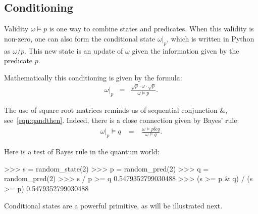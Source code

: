 \documentclass[leqno]{tufte-book} %
\newcommand{\Python}{\textrm{Python}\xspace}
\newcommand{\andthen}{\mathrel{\&}}
\begin{document}
\subsection{Conditioning}\label{subsec:qpred:conditioning}

Validity $\omega\models p$ is one way to combine states and
predicates. When this validity is non-zero, one can also form the
conditional state $\omega|_{p}$,
which is written in \Python as $\omega/p$. This new state is an update
of $\omega$ given the information given by the predicate $p$.

Mathematically this conditioning is given by the formula:
\begin{equation}
\label{eqn:qconditiong}
\begin{array}{rcl}
\omega|_{p}
& = &
\displaystyle\frac{\sqrt{p} \cdot \omega \cdot \sqrt{p}}{\omega\models p}.
\end{array}
\end{equation}

\noindent The use of square root matrices reminds us of sequential
conjunction $\andthen$, see~\eqref{eqn:qandthen}. Indeed, there is a
close connection given by Bayes' rule:
\begin{equation}
\label{eqn:qbayes}
\begin{array}{rcl}
\omega|_{p} \models q
& \;=\; &
\displaystyle\frac{\omega\models p\andthen q}{\omega\models q}.
\end{array}
\end{equation}

\noindent Here is a test of Bayes rule in the quantum world:
\begin{python}
>>> s = random_state(2)
>>> p = random_pred(2)
>>> q = random_pred(2)
>>> s / p >= q
0.5479352799030488
>>> (s >= p & q) / (s >= p)
0.5479352799030488
\end{python}

\noindent Conditional states are a powerful primitive, as will
be illustrated next.
\end{document}
